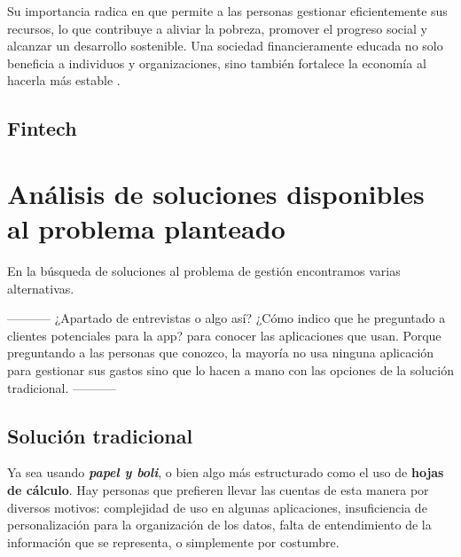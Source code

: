 Su importancia radica en que permite a las personas gestionar eficientemente sus recursos, 
lo que contribuye a aliviar la pobreza, promover el progreso social y alcanzar un 
desarrollo sostenible. Una sociedad financieramente educada no solo beneficia a individuos 
y organizaciones, sino también fortalece la economía al hacerla más estable \cite{capituloIX}
\cite{ariza2024educacion}\cite{sarango2023educacion}.

\subsection*{Fintech}


\section{Análisis de soluciones disponibles al problema planteado}
En la búsqueda de soluciones al problema de gestión encontramos varias alternativas. 

-----------
¿Apartado de entrevistas o algo así?
¿Cómo indico que he preguntado a clientes potenciales para la app? para 
conocer las aplicaciones que usan. Porque preguntando a las personas 
que conozco, la mayoría no usa ninguna aplicación para gestionar sus gastos
sino que lo hacen a mano con las opciones de la solución tradicional.
-----------

\subsection{Solución tradicional}
Ya sea usando \textit{\textbf{papel y boli}}, o bien algo más 
estructurado como el uso de \textbf{hojas de cálculo}. Hay personas que prefieren llevar las 
cuentas de esta manera por diversos motivos: complejidad de uso en algunas aplicaciones, 
insuficiencia de personalización para la organización de los datos, falta de entendimiento 
de la información que se representa, o simplemente por costumbre.

    
    

